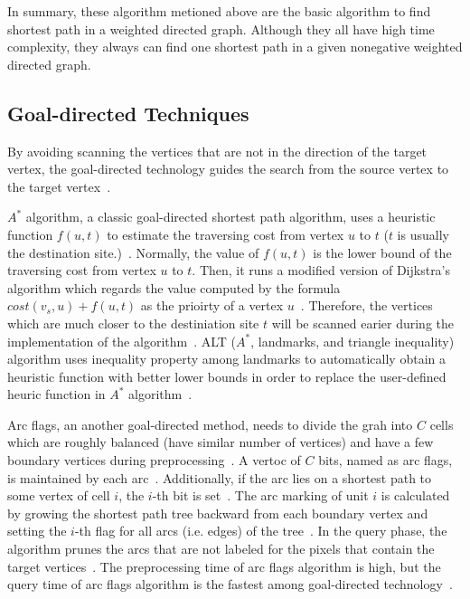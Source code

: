 \documentclass[conference]{IEEEtran}
\begin{document}
In summary, these algorithm metioned above are the basic algorithm to find shortest path in a weighted directed graph. Although they all have high time complexity, they always can find one shortest path in a given nonegative weighted directed graph.

\subsection{Goal-directed Techniques}
By avoiding scanning the vertices that are not in the direction of the target vertex, the goal-directed technology guides the search from the source vertex to the target vertex~\cite{bast2016route}.

$A^*$ algorithm, a classic goal-directed shortest path algorithm, uses a heuristic function $f(u,t)$ to estimate the traversing cost from vertex $u$ to $t$ ($t$ is usually the destination site.)~\cite{Hart1968formal}. Normally, the value of $f(u,t)$ is the lower bound of the traversing cost from vertex $u$ to $t$. Then, it runs a modified version of Dijkstra's algorithm which regards the value computed by the formula $cost(v_s, u)+f(u,t)$ as the prioirty of a vertex $u$~\cite{bast2016route}. Therefore, the vertices which are much closer to the destiniation site $t$ will be scanned earier during the implementation of the algorithm~\cite{bast2016route}. ALT ($A^*$, landmarks, and triangle inequality) algorithm uses inequality property among landmarks to automatically obtain a heuristic function with better lower bounds in order to replace the user-defined heuric function in $A^*$ algorithm~\cite{goldberg2005computing}. 

Arc flags, an another goal-directed method, needs to divide the grah into $C$ cells which are roughly balanced (have similar number of vertices) and have a few boundary vertices during preprocessing~\cite{hilger2009fast, lauther2006experimental}. A vertoc of $C$ bits, named as arc flags, is maintained by each arc~\cite{hilger2009fast, lauther2006experimental}. Additionally, if the arc lies on a shortest path to some vertex of cell $i$, the $i$-th bit is set~\cite{hilger2009fast, lauther2006experimental}. The arc marking of unit $i$ is calculated by growing the shortest path tree backward from each boundary vertex and setting the $i$-th flag for all arcs (i.e. edges) of the tree~\cite{hilger2009fast, lauther2006experimental}. In the query phase, the algorithm prunes the arcs that are not labeled for the pixels that contain the target vertices~\cite{bast2016route}. The preprocessing time of arc flags algorithm is high, but the query time of arc flags algorithm is the fastest among goal-directed technology~\cite{self_driving}.
\end{document}
